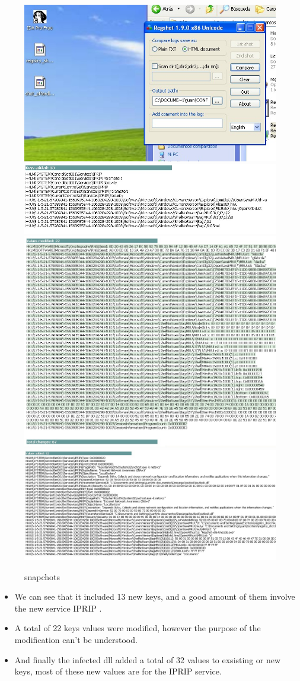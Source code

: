 \documentclass[12pt,letter]{article} %
\begin{document}
            \\
            \begin{figure}[h!]
                \centering
                \includegraphics[width=0.4\linewidth]{punto5_1.jpeg}
                \includegraphics[width=0.4\linewidth]{punto5_2.jpeg}
                \\
                \includegraphics[width=0.4\linewidth]{punto5_3.jpeg}
                \includegraphics[width=0.4\linewidth]{punto5_4.jpeg}
                \caption{snapchots}
                \label{snapchots snapchots... }
            \end{figure}

            \begin{itemize}
                \item {We can see that it included 13 new keys, and a good amount of them
            involve the new service IPRIP .}
            \item {A total of 22 keys values were modified, however the purpose of the
            modification can't be understood.}
            \item {And finally the infected dll added a total of 32 values to
            exsisting or new keys, most of these new values are for the IPRIP
            service.}
            \end{itemize}
\end{document}
